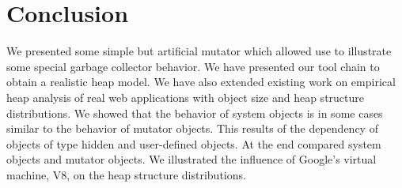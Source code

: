 
\section{Conclusion}

We presented some simple but artificial mutator which allowed use to illustrate some special garbage collector behavior. We have presented our tool chain to obtain a realistic \JS heap model. We have also extended existing work on empirical \JS heap analysis of real web applications with object size and heap structure distributions. We showed that the behavior of system objects is in some cases similar to the behavior of mutator objects. This results of the dependency of objects of type hidden and user-defined objects. At the end compared system objects and mutator objects. We illustrated the influence of Google's \JS virtual machine, V8, on the heap structure distributions.